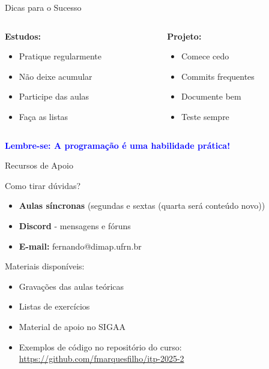 \documentclass[10pt]{beamer}
\begin{document}
\begin{frame}{Dicas para o Sucesso}
	\begin{columns}
		\begin{column}{0.5\textwidth}
			\textbf{Estudos:}
			\begin{itemize}
				\item Pratique regularmente
				\item Não deixe acumular
				\item Participe das aulas
				\item Faça as listas
			\end{itemize}
		\end{column}
		\begin{column}{0.5\textwidth}
			\textbf{Projeto:}
			\begin{itemize}
				\item Comece cedo
				\item Commits frequentes
				\item Documente bem
				\item Teste sempre
			\end{itemize}
		\end{column}
	\end{columns}
	
	\bigskip
	\begin{center}
		\textcolor{blue}{\textbf{Lembre-se: A programação é uma habilidade prática!}}
	\end{center}
\end{frame}

\begin{frame}{Recursos de Apoio}
	\begin{block}{Como tirar dúvidas?}
		\begin{itemize}
			\item \textbf{Aulas síncronas} (segundas e sextas (quarta será conteúdo novo))
			\item \textbf{Discord} - mensagens e fóruns
			\item \textbf{E-mail:} fernando@dimap.ufrn.br
		\end{itemize}
	\end{block}
	
	\begin{exampleblock}{Materiais disponíveis:}
		\begin{itemize}
			\item Gravações das aulas teóricas
			\item Listas de exercícios
			\item Material de apoio no SIGAA
			\item Exemplos de código no repositório do curso: \url{https://github.com/fmarquesfilho/itp-2025-2}
		\end{itemize}
	\end{exampleblock}
\end{frame}
\end{document}
